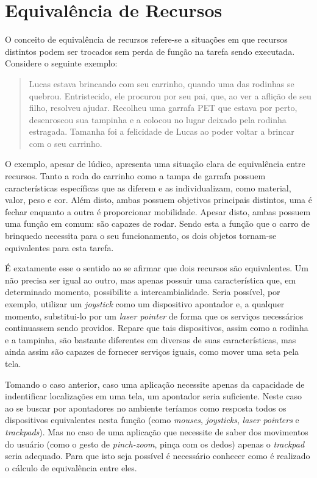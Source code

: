 \section{Equivalência de Recursos}
\label{sec:equivalenciaRecursos}

O conceito de equivalência de recursos refere-se a situações em que recursos distintos podem ser trocados sem perda de função na tarefa sendo executada. Considere o seguinte exemplo:

\begin{quote}
	Lucas estava brincando com seu carrinho, quando uma das rodinhas se quebrou. Entristecido, ele procurou por seu pai, que, ao ver a aflição de seu filho, resolveu ajudar. Recolheu uma garrafa PET que estava por perto, desenroscou sua tampinha e a colocou no lugar deixado pela rodinha estragada. Tamanha foi a felicidade de Lucas ao poder voltar a brincar com o seu carrinho.
\end{quote}

O exemplo, apesar de lúdico, apresenta uma situação clara de equivalência entre recursos. Tanto a roda do carrinho como a tampa de garrafa possuem características específicas que as diferem e as individualizam, como material, valor, peso e cor. Além disto, ambas possuem objetivos principais distintos, uma é fechar enquanto a outra é proporcionar mobilidade. Apesar disto, ambas possuem uma função em comum: são capazes de rodar. Sendo esta a função que o carro de brinquedo necessita para o seu funcionamento, os dois objetos tornam-se equivalentes para esta tarefa.

É exatamente esse o sentido ao se afirmar que dois recursos são equivalentes. Um não precisa ser igual ao outro, mas apenas possuir uma característica que, em determinado momento, possibilite a intercambialidade. Seria possível, por exemplo, utilizar um \emph{joystick} como um dispositivo apontador e, a qualquer momento, substitui-lo por um \emph{laser pointer} de forma que os serviços necessários continuassem sendo providos. Repare que tais dispositivos, assim como a rodinha e a tampinha, são bastante diferentes em diversas de suas características, mas ainda assim são capazes de fornecer serviços iguais, como mover uma seta pela tela.

Tomando o caso anterior, caso uma aplicação necessite apenas da capacidade de indentificar localizações em uma tela, um apontador seria suficiente. Neste caso ao se buscar por apontadores no ambiente teríamos como resposta todos os dispositivos equivalentes nesta função (como \emph{mouses}, \emph{joysticks}, \emph{laser pointers} e \emph{trackpads}). Mas no caso de uma aplicação que necessite de saber dos movimentos do usuário (como o gesto de \emph{pinch-zoom}, pinça com os dedos) apenas o \emph{trackpad} seria adequado. Para que isto seja possível é necessário conhecer como é realizado o cálculo de equivalência entre eles.


